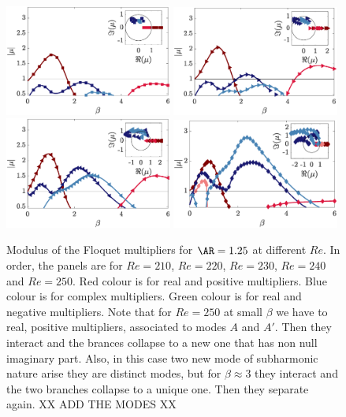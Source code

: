 \begin{figure}
  \centering
  \includegraphics[width=0.49\textwidth]{./fig/AR1p25/mu_beta_Re210.eps}
  \includegraphics[width=0.49\textwidth]{./fig/AR1p25/mu_beta_Re220.eps}
  \includegraphics[width=0.49\textwidth]{./fig/AR1p25/mu_beta_Re230.eps}
  \includegraphics[width=0.49\textwidth]{./fig/AR1p25/mu_beta_Re240.eps}
  \caption{Modulus of the Floquet multipliers for $\AR=1.25$ at different $Re$. In order, the panels are for $Re=210$, $Re=220$, $Re=230$, $Re=240$ and $Re=250$. Red colour is for real and positive multipliers. Blue colour is for complex multipliers. Green colour is for real and negative multipliers. Note that for $Re=250$ at small $\beta$ we have to real, positive multipliers, associated to modes $A$ and $A'$. Then they interact and the brances collapse to a new one that has non null imaginary part. Also, in this case two new mode of subharmonic nature arise they are distinct modes, but for $\beta \approx 3$ they interact and the two branches collapse to a unique one. Then they separate again. XX ADD THE MODES XX}
\end{figure}



